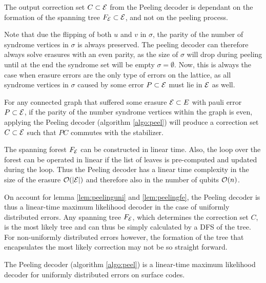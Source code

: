\begin{lemma}\label{lem:peelingfe}
  The output correction set $C\subset\mathcal{E}$ from the Peeling decoder is dependant on the formation of the spanning tree $F_{\mathcal{E}}\subset\mathcal{E}$, and not on the peeling process. 
\end{lemma}

Note that due the flipping of both $u$ and $v$ in $\sigma$, the parity of the number of syndrome vertices in $\sigma$ is always preserved. The peeling decoder can therefore always solve erasures with an even parity, as the size of $\sigma$ will drop during peeling until at the end the syndrome set will be empty $\sigma = \emptyset$. Now, this is always the case when erasure errors are the only type of errors on the lattice, as all syndrome vertices in $\sigma$ caused by some error $P\subset\mathcal{E}$ must lie in $\mathcal{E}$ as well. 
\begin{theorem}
  For any connected graph that suffered some erasure $\mathcal{E}\subset E$ with pauli error $P\subset \mathcal{E}$, if the parity of the number syndrome vertices within the graph is even, applying the Peeling decoder (algorithm \ref{algo:peel}) will produce a correction set $C\subset \mathcal{E}$ such that $PC$ commutes with the stabilizer.
\end{theorem}

The spanning forest $F_{\mathcal{E}}$ can be constructed in linear time. Also, the loop over the forest can be operated in linear if the list of leaves is pre-computed and updated during the loop. Thus the Peeling decoder has a linear time complexity in the size of the erasure $\mathcal{O}(\abs{\mathcal{E}})$ and therefore also in the number of qubits $\mathcal{O}(n)$.

On account for lemma \ref{lem:peelinguni} and \ref{lem:peelingfe}, the Peeling decoder is thus a linear-time maximum likelihood decoder in the case of uniformly distributed errors. Any spanning tree $F_{\mathcal{E}}$, which determines the correction set $C$, is the most likely tree and can thus be simply calculated by a DFS of the tree. For non-uniformly distributed errors however, the formation of the tree that encapsulates the most likely correction may not be so straight forward. 
\begin{theorem}
  The Peeling decoder (algorithm \ref{algo:peel}) is a linear-time maximum likelihood decoder for uniformly distributed errors on surface codes. 
\end{theorem}

